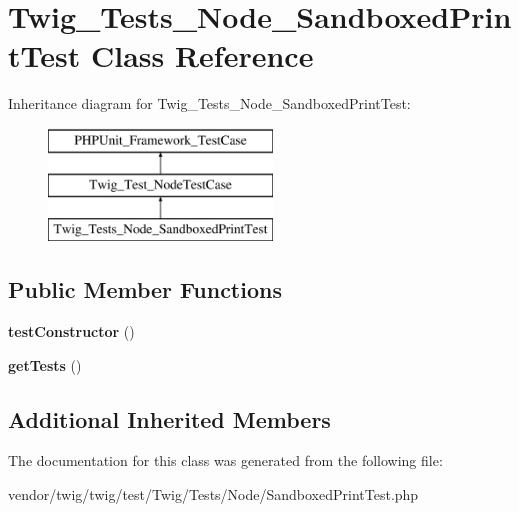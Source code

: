 \hypertarget{classTwig__Tests__Node__SandboxedPrintTest}{}\section{Twig\+\_\+\+Tests\+\_\+\+Node\+\_\+\+Sandboxed\+Print\+Test Class Reference}
\label{classTwig__Tests__Node__SandboxedPrintTest}
Inheritance diagram for Twig\+\_\+\+Tests\+\_\+\+Node\+\_\+\+Sandboxed\+Print\+Test\+:\begin{figure}[H]
\begin{center}
\leavevmode
\includegraphics[height=3.000000cm]{classTwig__Tests__Node__SandboxedPrintTest}
\end{center}
\end{figure}
\subsection*{Public Member Functions}
\begin{DoxyCompactItemize}
\item 
{\bfseries test\+Constructor} ()\hypertarget{classTwig__Tests__Node__SandboxedPrintTest_a0e93671eaecb3dd7f98f0c979eeb5913}{}\label{classTwig__Tests__Node__SandboxedPrintTest_a0e93671eaecb3dd7f98f0c979eeb5913}

\item 
{\bfseries get\+Tests} ()\hypertarget{classTwig__Tests__Node__SandboxedPrintTest_a8d1aa226e65f7a7db17c0cdb108d8143}{}\label{classTwig__Tests__Node__SandboxedPrintTest_a8d1aa226e65f7a7db17c0cdb108d8143}

\end{DoxyCompactItemize}
\subsection*{Additional Inherited Members}


The documentation for this class was generated from the following file\+:\begin{DoxyCompactItemize}
\item 
vendor/twig/twig/test/\+Twig/\+Tests/\+Node/Sandboxed\+Print\+Test.\+php\end{DoxyCompactItemize}
